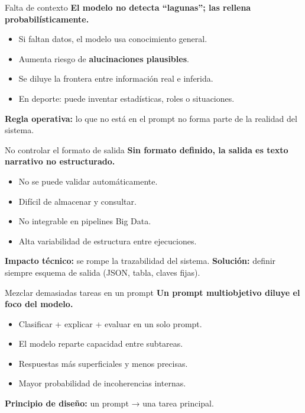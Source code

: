 \documentclass[aspectratio=169]{beamer}
\begin{document}
\begin{frame}{Falta de contexto}
\textbf{El modelo no detecta “lagunas”; las rellena probabilísticamente.}
\vspace{0.4em}
\begin{itemize}
    \item Si faltan datos, el modelo usa conocimiento general.
    \item Aumenta riesgo de \textbf{alucinaciones plausibles}.
    \item Se diluye la frontera entre información real e inferida.
    \item En deporte: puede inventar estadísticas, roles o situaciones.
\end{itemize}
\vspace{0.4em}
\textbf{Regla operativa:} lo que no está en el prompt no forma parte de la realidad del sistema.
\end{frame}

\begin{frame}{No controlar el formato de salida}
\textbf{Sin formato definido, la salida es texto narrativo no estructurado.}
\vspace{0.4em}
\begin{itemize}
    \item No se puede validar automáticamente.
    \item Difícil de almacenar y consultar.
    \item No integrable en pipelines Big Data.
    \item Alta variabilidad de estructura entre ejecuciones.
\end{itemize}
\vspace{0.4em}
\textbf{Impacto técnico:} se rompe la trazabilidad del sistema.
\textbf{Solución:} definir siempre esquema de salida (JSON, tabla, claves fijas).
\end{frame}

\begin{frame}{Mezclar demasiadas tareas en un prompt}
\textbf{Un prompt multiobjetivo diluye el foco del modelo.}
\vspace{0.4em}
\begin{itemize}
    \item Clasificar + explicar + evaluar en un solo prompt.
    \item El modelo reparte capacidad entre subtareas.
    \item Respuestas más superficiales y menos precisas.
    \item Mayor probabilidad de incoherencias internas.
\end{itemize}
\vspace{0.4em}
\textbf{Principio de diseño:} un prompt → una tarea principal.
\end{frame}
\end{document}
